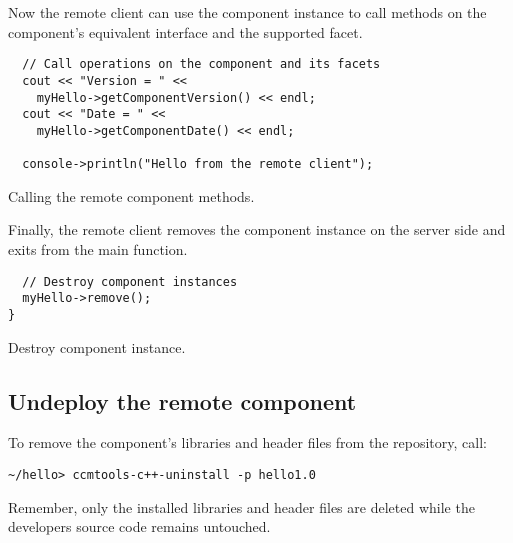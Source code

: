 \noindent 
Now the remote client can use the component instance to call methods on
the component's equivalent interface and the supported facet.
\begin{Example}
\begin{minifbox}
\begin{small}
\begin{verbatim}
  // Call operations on the component and its facets
  cout << "Version = " << 
    myHello->getComponentVersion() << endl;
  cout << "Date = " << 
    myHello->getComponentDate() << endl;

  console->println("Hello from the remote client");
\end{verbatim}
\end{small}
\end{minifbox}
\caption{Calling the remote component methods.}
\label{RemoteMethodCalling}
\end{Example}

\noindent
Finally, the remote client removes the component instance on the server side
and exits from the main function.

\begin{Example}
\begin{minifbox}
\begin{small}
\begin{verbatim}
  // Destroy component instances
  myHello->remove();
}
\end{verbatim}
\end{small}
\end{minifbox}
\caption{Destroy component instance.}
\label{DestroyComponent}
\end{Example}



\subsection{Undeploy the remote component}

To remove the component's libraries and header files from the repository, 
call:
\begin{verbatim}
~/hello> ccmtools-c++-uninstall -p hello1.0
\end{verbatim}
Remember, only the installed libraries and header files are deleted while
the developers source code remains untouched.



